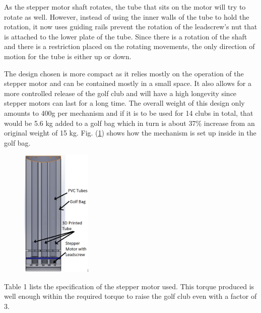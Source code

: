 \documentclass[11pt,landscape]{article}
\begin{document}
\begin{multicols}{3}
As the stepper motor shaft rotates, the tube that sits on the motor will try to
rotate as well. However, instead of using the inner walls of the tube to hold
the rotation, it now uses guiding rails prevent the rotation of the leadscrew’s
nut that is attached to the lower plate of the tube. Since there is a rotation
of the shaft and there is a restriction placed on the rotating movements, the
only direction of motion for the tube is either up or down.

The design chosen is more compact as it relies mostly on the operation of the
stepper motor and can be contained mostly in a small space. It also allows for a
more controlled release of the golf club and will have a high longevity since
stepper motors can last for a long time. The overall weight of this design only
amounts to 400g per mechanism and if it is to be used for 14 clubs in total,
that would be 5.6 kg added to a golf bag which in turn is about 37\% increase
from an original weight of 15 kg. Fig. (\ref{fig:stepper_in_bag}) shows how the mechanism
is set up inside in the golf bag.

\begin{figure}[H]
    \begin{center}
        \includegraphics[width=0.3\textwidth]{Mech in bag.png}
        \label{fig:stepper_in_bag}
    \end{center}
\end{figure}

Table 1 lists the specification of the stepper motor used. This torque produced
is well enough within the required torque to raise the golf club even with a
factor of 3.


\end{multicols}
\end{document}
